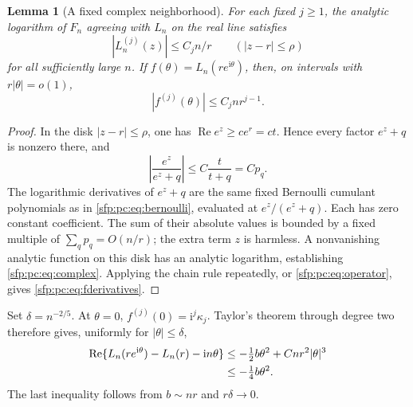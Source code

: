\documentclass[11pt,letterpaper]{article}
\numberwithin{equation}{section}
\newtheorem{lemma}[theorem]{Lemma}
\theoremstyle{definition}\newtheorem{definition}[theorem]{Definition}
\theoremstyle{remark}\newtheorem{remark}[theorem]{Remark}
\newcommand{\ii}{\mathrm i}
\begin{document}
\begin{lemma}[A fixed complex neighborhood]\label{sfp:pc:lem:complex}
For each fixed $j\geq1$, the analytic logarithm of $F_n$ agreeing
with $L_n$ on the real line satisfies
\begin{equation}\label{sfp:pc:eq:complex}
 |L_n^{(j)}(z)|\leq C_jn/r\qquad(|z-r|\leq\rho)
\end{equation}
for all sufficiently large $n$. If
$f(\theta)=L_n(re^{\ii\theta})$, then, on intervals with
$r|\theta|=o(1)$,
\begin{equation}\label{sfp:pc:eq:fderivatives}
 |f^{(j)}(\theta)|\leq C_jnr^{j-1}.
\end{equation}
\end{lemma}
\begin{proof}
In the disk $|z-r|\leq\rho$, one has
$\operatorname{Re}e^z\geq c e^r=ct$. Hence every factor
$e^z+q$ is nonzero there, and
\[
 \left|\frac{e^z}{e^z+q}\right|
       \leq C\frac{t}{t+q}=Cp_q.
\]
The logarithmic derivatives of $e^z+q$ are the same fixed
Bernoulli cumulant polynomials as in \eqref{sfp:pc:eq:bernoulli},
evaluated at $e^z/(e^z+q)$. Each has zero constant coefficient.
The sum of their absolute values is bounded by a fixed multiple
of $\sum_qp_q=O(n/r)$; the extra term $z$ is harmless.
A nonvanishing analytic function on this disk has an analytic
logarithm, establishing \eqref{sfp:pc:eq:complex}. Applying the chain
rule repeatedly, or \eqref{sfp:pc:eq:operator}, gives
\eqref{sfp:pc:eq:fderivatives}.
\end{proof}

Set $\delta=n^{-2/5}$. At $\theta=0$,
$f^{(j)}(0)=\ii^j\kappa_j$. Taylor's theorem through degree two
therefore gives, uniformly for $|\theta|\leq\delta$,
\begin{align}
 \operatorname{Re}\{L_n(re^{\ii\theta})-L_n(r)-\ii n\theta\}
 &\leq-\tfrac12b\theta^2+Cnr^2|\theta|^3\notag\\
 &\leq-\tfrac14b\theta^2.\label{sfp:pc:eq:localgaussian}
\end{align}
The last inequality follows from $b\sim nr$ and $r\delta\to0$.
\end{document}
